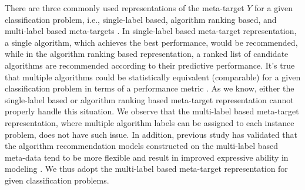 \documentclass[acmsmall]{acmart}
\begin{document}
There are three commonly used representations of the meta-target $Y$ for a given classification problem,
i.e., single-label based\cite{Pise2016Algorithm}, algorithm ranking based\cite{Brazdil2003Rank}, and multi-label based meta-targets \cite{wang2014generic,zhu2018new}.
In single-label based meta-target representation,
a single algorithm, which achieves the best performance, would be recommended,
while in the algorithm ranking based representation,
a ranked list of candidate algorithms are recommended according to their predictive performance.
It's true that multiple algorithms could be statistically equivalent (comparable) for a given classification problem in terms of a performance metric \cite{wang2014generic}.
As we know, either the single-label based or algorithm ranking based meta-target representation cannot properly handle this situation.
We observe that the multi-label based meta-target representation, where multiple algorithm labels can be assigned to each instance problem,
does not have such issue.
In addition,
previous study has validated that the algorithm recommendation models constructed on the multi-label based meta-data
tend to be more flexible and result in improved expressive ability in modeling \cite{wang2014generic}.
We thus adopt the multi-label based meta-target representation for given classification problems.

\end{document}
